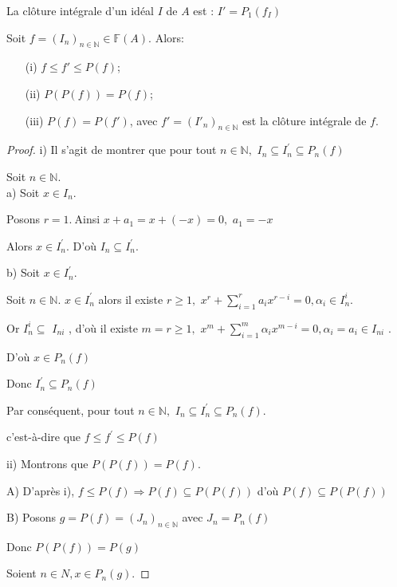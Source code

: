 \begin{maremarque}
	La clôture intégrale d'un idéal $I$ de $A$ est : $I'=P_1(f_I)$
\end{maremarque}
\begin{maproposition}
	Soit $f=(I_n)_{n \in \mathbb{N}} \in \mathbb{F}(A)$. Alors:\\
	\begin{enumerate}
		\item[(i)] $ f \leqslant f' \leqslant P(f)$;
		\item[(ii)] $ P(P(f)) = P(f)$;
		\item[(iii)] $P(f) = P(f')$, avec $f'=(I'_n)_{n \in \mathbb{N}}$ est la clôture intégrale de $f$.
	\end{enumerate}
\end{maproposition}
\begin{proof}
	i) Il s'agit de montrer que pour tout $n\in \mathbb{N},$ $I_{n}\subseteq I_{n}^{\prime }\subseteq P_{n}(f)$
	
	Soit $n\in \mathbb{N}.$ \\
	a) Soit $x\in I_{n}.$
	
	Posons $r=1.~$Ainsi $x+a_{1}=x+(-x)=0,$ $a_{1}=-x$
	
	Alors $x\in I_{n}^{\prime }.$ D'où $I_{n}\subseteq I_{n}^{\prime }.$
	
	b) Soit $x\in I_{n}^{\prime }.$
	
	Soit $n\in \mathbb{N}.$
	$x\in I_{n}^{\prime }$ alors il existe $r\geq 1,$ $x^{r}+\sum\limits_{i=1}^{r}a_{i}x^{r-i}=0,\alpha _{i}\in I_{n}^{i}$.
	
	Or $I_{n}^{i}\subseteq $ $I_{ni}$ , d'où il existe $m=r\geq 1,$ $x^{m}+\sum\limits_{i=1}^{m}\alpha _{i}x^{m-i}=0,\alpha _{i}=a_{i}\in I_{ni}$
	.
	
	D'où $x\in P_{n}(f)$
	
	Donc $I_{n}^{\prime }\subseteq P_{n}(f)$
	
	Par conséquent, pour tout $n\in \mathbb{N},$ $I_{n}\subseteq I_{n}^{\prime }\subseteq P_{n}(f).$
	
	c'est-\`{a}-dire que $f\leq f^{\prime }\leq P(f)$
	
	ii) Montrons que $P(P(f))=P(f).$
	
	A) D'après i), $f\leq P(f)\Rightarrow P(f)\subseteq P(P(f))$ d'où $P(f)\subseteq P(P(f))$
	
	B) Posons $g=P(f)=(J_{n})_{n\in \mathbb{N}}$ avec $J_{n}=P_{n}(f)$
	
	Donc $P(P(f))=P(g)$
	
	Soient $n\in N,x\in P_{n}(g).$
	

\end{proof}
